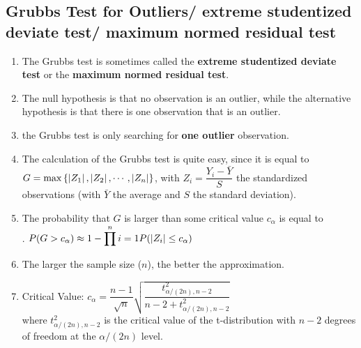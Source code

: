 \subsection{Grubbs Test for Outliers/ extreme studentized deviate test/ maximum normed residual test}

\begin{enumerate}
    \item The Grubbs test is sometimes called the \textbf{extreme studentized deviate test} or the \textbf{maximum normed residual test}. 
    \hfill \cite{statistics/book/Statistics-for-Data-Scientists/Maurits-Kaptein}

    \item  The null hypothesis is that no observation is an outlier, while the alternative hypothesis is that there is one observation that is an outlier.
    \hfill \cite{statistics/book/Statistics-for-Data-Scientists/Maurits-Kaptein}

    \item the Grubbs test is only searching for \textbf{one outlier} observation.
    \hfill \cite{statistics/book/Statistics-for-Data-Scientists/Maurits-Kaptein}

    \item  The calculation of the Grubbs test is quite easy, since it is equal to $G = \max \left\{\left| Z_1 \right|, \left| Z_2 \right|, \cdots , \left| Z_n \right|\right\}$, with $Z _i = \dfrac{Y_i - \bar{Y} }{S}$ the standardized observations (with $\bar{Y}$ the average and $S$ the standard deviation).
    \hfill \cite{statistics/book/Statistics-for-Data-Scientists/Maurits-Kaptein}

    \item The probability that $G$ is larger than some critical value $c_{\alpha}$ is equal to
    \hfill \cite{statistics/book/Statistics-for-Data-Scientists/Maurits-Kaptein}
    \\[0.2cm]
    .\hfill
    $ P (G > c_{\alpha}) \approx 1 - \displaystyle\prod^n {i=1} P (\left| Z _i \right| \leq c_{\alpha}) $
    \hfill \cite{statistics/book/Statistics-for-Data-Scientists/Maurits-Kaptein}

    \item The larger the sample size ($n$), the better the approximation.
    \hfill \cite{statistics/book/Statistics-for-Data-Scientists/Maurits-Kaptein}

    \item Critical Value: $ c_\alpha = \dfrac{n-1}{\sqrt{n}} \sqrt{\dfrac{t^2_{\alpha/(2n), n-2}}{n-2+t^2_{\alpha/(2n), n-2}}}$
    \hfill \cite{common/online/chatgpt}
    \\
    where $t^2_{\alpha/(2n), n-2}$ is the critical value of the t-distribution with $n-2$ degrees of freedom at the $\alpha/(2n)$ level.
    \hfill \cite{common/online/chatgpt}


\end{enumerate}
